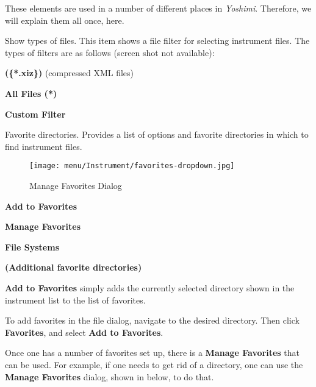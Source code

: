    These elements are used in a number of different places in \textsl{Yoshimi}.
   Therefore, we will explain them all once, here.

   \setcounter{ItemCounter}{0}      %

   Show types of files.
   This item shows a file filter for selecting instrument files.
   The types of filters are as follows (screen shot not available):

   \begin{enumber}
      \item \textbf{(\{*.xiz\})} (compressed XML files)
      \item \textbf{All Files (*)}
      \item \textbf{Custom Filter}
   \end{enumber}

   Favorite directories.
   Provides a list of options and favorite directories in which to find 
   instrument files.

\begin{figure}[H]
   \centering 
   \texttt{[image: menu/Instrument/favorites-dropdown.jpg]}
   \caption{Manage Favorites Dialog}
   \label{fig:open_instrument_favorites}
\end{figure}

   \begin{enumber}
      \item \textbf{Add to Favorites}
      \item \textbf{Manage Favorites}
      \item \textbf{File Systems}
      \item \textbf{(Additional favorite directories)}
   \end{enumber}

   \textbf{Add to Favorites}
   simply adds the currently selected directory shown in the instrument list
   to the list of favorites.

   To add favorites in the file dialog, navigate to the desired directory.
   Then click \textbf{Favorites}, and select \textbf{Add to Favorites}.

   Once one has a number of favorites set up,
   there is a \textbf{Manage Favorites} that can be used.
   For example, if one needs to get rid of a directory, one can use the
   \textbf{Manage Favorites}
   dialog, shown in
    below,
   to do that.

